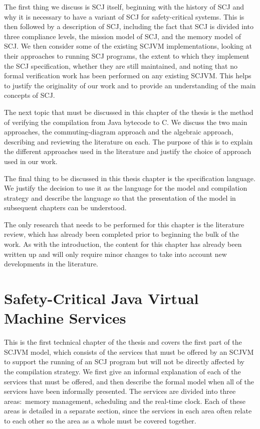 \documentclass[a4paper,10pt]{report}
\begin{document}
The first thing we discuss is SCJ itself, beginning with the history
of SCJ and why it is necessary to have a variant of SCJ for
safety-critical systems.
This is then followed by a description of SCJ, including the fact that
SCJ is divided into three compliance levels, the mission model of SCJ,
and the memory model of SCJ.
We then consider some of the existing SCJVM implementations, looking
at their approaches to running SCJ programs, the extent to which they
implement the SCJ specification, whether they are still maintained,
and noting that no formal verification work has been performed on any
existing SCJVM.
This helps to justify the originality of our work and to provide an
understanding of the main concepts of SCJ.

The next topic that must be discussed in this chapter of the thesis is
the method of verifying the compilation from Java bytecode to C.
We discuss the two main approaches, the commuting-diagram approach and
the algebraic approach, describing and reviewing the literature on
each.
The purpose of this is to explain the different approaches used in
the literature and justify the choice of approach used in our work.

The final thing to be discussed in this thesis chapter is the
\Circus{} specification language.
We justify the decision to use it as the language for the model and
compilation strategy and describe the language so that the
presentation of the model in subsequent chapters can be understood.

The only research that needs to be performed for this chapter is the
literature review, which has already been completed prior to beginning
the bulk of the work.
As with the introduction, the content for this chapter has already
been written up and will only require minor changes to take into
account new developments in the literature.

\section{Safety-Critical Java Virtual Machine Services}

This is the first technical chapter of the thesis and covers the first
part of the SCJVM model, which consists of the services that must be
offered by an SCJVM to support the running of an SCJ program but will
not be directly affected by the compilation strategy.
We first give an informal explanation of each of the services that
must be offered, and then describe the formal \Circus{} model when all
of the services have been informally presented.
The services are divided into three areas:~memory management,
scheduling and the real-time clock.
Each of these areas is detailed in a separate section, since the
services in each area often relate to each other so the area as a
whole must be covered together.
\end{document}
